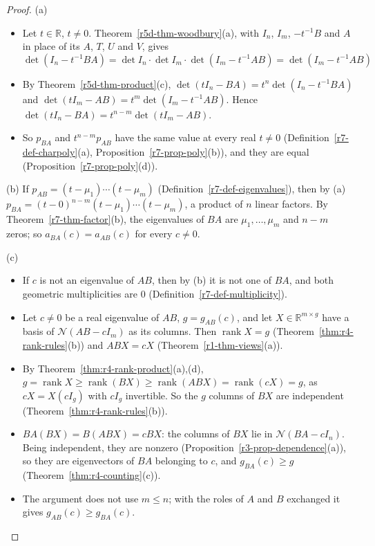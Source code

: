\documentclass[12pt]{article}
\newcommand{\R}{\mathbb R}
\DeclareMathOperator{\rank}{rank}
\theoremstyle{definition}
\begin{document}
\begin{proof}
(a)
\begin{itemize}
\item Let \(t\in\R\), \(t\ne0\). Theorem~\ref{r5d-thm-woodbury}(a), with \(I_n\), \(I_m\), \(-t^{-1}B\) and \(A\) in
place of its \(A\), \(T\), \(U\) and \(V\), gives
\[
\det(I_n-t^{-1}BA)=\det I_n\cdot\det I_m\cdot\det(I_m-t^{-1}AB)=\det(I_m-t^{-1}AB)
\]
\item By Theorem~\ref{r5d-thm-product}(c), \(\det(tI_n-BA)=t^n\det(I_n-t^{-1}BA)\) and
\(\det(tI_m-AB)=t^m\det(I_m-t^{-1}AB)\). Hence \(\det(tI_n-BA)=t^{n-m}\det(tI_m-AB)\).
\item So \(p_{BA}\) and \(t^{n-m}p_{AB}\) have the same value at every real \(t\ne0\) (Definition~\ref{r7-def-charpoly}(a),
Proposition~\ref{r7-prop-poly}(b)), and they are equal (Proposition~\ref{r7-prop-poly}(d)).
\end{itemize}
(b) If \(p_{AB}=(t-\mu_1)\cdots(t-\mu_m)\) (Definition~\ref{r7-def-eigenvalues}), then by (a)
\(p_{BA}=(t-0)^{n-m}(t-\mu_1)\cdots(t-\mu_m)\), a product of \(n\) linear factors. By Theorem~\ref{r7-thm-factor}(b), the
eigenvalues of \(BA\) are \(\mu_1,\dots,\mu_m\) and \(n-m\) zeros; so \(a_{BA}(c)=a_{AB}(c)\) for every \(c\ne0\).

(c)
\begin{itemize}
\item If \(c\) is not an eigenvalue of \(AB\), then by (b) it is not one of \(BA\), and both geometric multiplicities are
\(0\) (Definition~\ref{r7-def-multiplicity}).
\item Let \(c\ne0\) be a real eigenvalue of \(AB\), \(g=g_{AB}(c)\), and let \(X\in\R^{m\times g}\) have a basis of
\(\mathcal N(AB-cI_m)\) as its columns. Then \(\rank X=g\) (Theorem~\ref{thm:r4-rank-rules}(b)) and \(ABX=cX\)
(Theorem~\ref{r1-thm-views}(a)).
\item By Theorem~\ref{thm:r4-rank-product}(a),(d), \(g=\rank X\geqslant\rank(BX)\geqslant\rank(ABX)=\rank(cX)=g\), as
\(cX=X(cI_g)\) with \(cI_g\) invertible. So the \(g\) columns of \(BX\) are independent
(Theorem~\ref{thm:r4-rank-rules}(b)).
\item \(BA(BX)=B(ABX)=cBX\): the columns of \(BX\) lie in \(\mathcal N(BA-cI_n)\). Being independent, they are
nonzero (Proposition~\ref{r3-prop-dependence}(a)), so they are eigenvectors of \(BA\) belonging to \(c\), and
\(g_{BA}(c)\geqslant g\) (Theorem~\ref{thm:r4-counting}(c)).
\item The argument does not use \(m\leqslant n\); with the roles of \(A\) and \(B\) exchanged it gives
\(g_{AB}(c)\geqslant g_{BA}(c)\).\qedhere
\end{itemize}
\end{proof}
\end{document}
